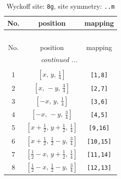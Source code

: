 \documentclass[fleqn,8pt]{jsarticle}
\begin{document}
\begin{longtable}{ccc}
\caption{Wyckoff site: {\tt 8g}, site symmetry: {\tt ..m}}
 \\
 \hline \hline
No. & position & mapping \\ \hline \endfirsthead

\multicolumn{2}{l}{\tablename\ \thetable{}} \\
 \hline \hline
No. & position & mapping \\ \hline \endhead

 \hline \hline
\multicolumn{2}{r}{\footnotesize\it continued ...} \\ \endfoot

 \hline \hline
\multicolumn{2}{r}{} \\ \endlastfoot

1 & $\left[ x,\, y,\, \frac{1}{4} \right]$ & {\tt [1,8]} \\ \hline
2 & $\left[ x,\, - y,\, \frac{3}{4} \right]$ & {\tt [2,7]} \\ \hline
3 & $\left[ - x,\, y,\, \frac{1}{4} \right]$ & {\tt [3,6]} \\ \hline
4 & $\left[ - x,\, - y,\, \frac{3}{4} \right]$ & {\tt [4,5]} \\ \hline
5 & $\left[ x + \frac{1}{2},\, y + \frac{1}{2},\, \frac{1}{4} \right]$ & {\tt [9,16]} \\ \hline
6 & $\left[ x + \frac{1}{2},\, \frac{1}{2} - y,\, \frac{3}{4} \right]$ & {\tt [10,15]} \\ \hline
7 & $\left[ \frac{1}{2} - x,\, y + \frac{1}{2},\, \frac{1}{4} \right]$ & {\tt [11,14]} \\ \hline
8 & $\left[ \frac{1}{2} - x,\, \frac{1}{2} - y,\, \frac{3}{4} \right]$ & {\tt [12,13]} \\
\end{longtable}
\renewcommand{\arraystretch}{1.2}
\end{document}

